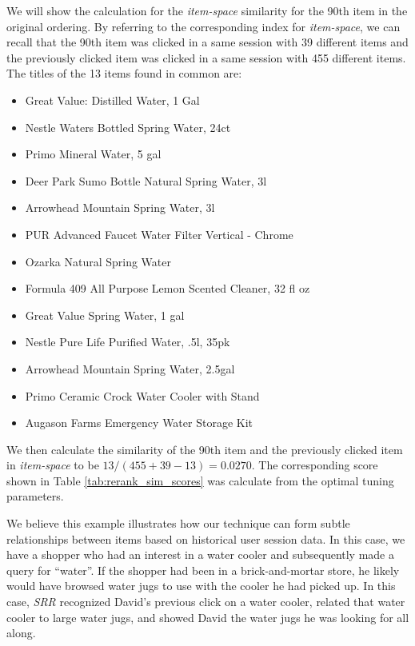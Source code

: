 \documentclass{article}
\begin{document}
We will show the calculation for the {\em item-space} similarity for the 90th
item in the original ordering. By referring to the corresponding index for {\em
item-space}, we can recall that the 90th item was clicked in a same session with
39 different items and the previously clicked item was clicked in a same session
with 455 different items. The titles of the 13 items found in common are:
\begin{itemize}
    \item[] Great Value: Distilled Water, 1 Gal
    \item[] Nestle Waters Bottled Spring Water, 24ct
    \item[] Primo Mineral Water, 5 gal
    \item[] Deer Park Sumo Bottle Natural Spring Water, 3l
    \item[] Arrowhead Mountain Spring Water, 3l
    \item[] PUR Advanced Faucet Water Filter Vertical - Chrome
    \item[] Ozarka Natural Spring Water
    \item[] Formula 409 All Purpose Lemon Scented Cleaner, 32 fl oz
    \item[] Great Value Spring Water, 1 gal
    \item[] Nestle Pure Life Purified Water, .5l, 35pk
    \item[] Arrowhead Mountain Spring Water, 2.5gal
    \item[] Primo Ceramic Crock Water Cooler with Stand
    \item[] Augason Farms Emergency Water Storage Kit
\end{itemize}
We then calculate the similarity of the 90th item and the previously clicked
item in {\em item-space} to be $13/(455+39-13)=0.0270$. The corresponding score
shown in Table \ref{tab:rerank_sim_scores} was calculate from the optimal tuning
parameters.

We believe this example illustrates how our technique can form subtle
relationships between items based on historical user session data. In this case,
we have a shopper who had an interest in a water cooler and subsequently made a
query for ``water''. If the shopper had been in a brick-and-mortar store, he
likely would have browsed water jugs to use with the cooler he had picked up. In
this case, {\em SRR} recognized David's previous click on a water cooler,
related that water cooler to large water jugs, and showed David the water jugs
he was looking for all along.
\end{document}
